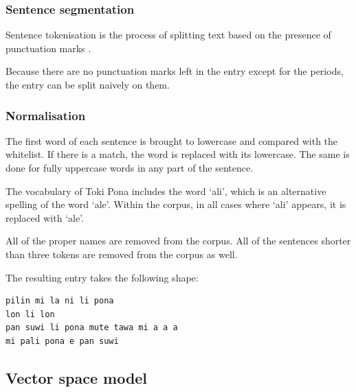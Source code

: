 \documentclass[14pt, a4paper]{extreport}
\begin{document}
%
      \subsubsection{Sentence segmentation}
Sentence tokenisation is the process of splitting text based on the presence of punctuation marks \parencite[51]{vajjala}.

Because there are no punctuation marks left in the entry except for the periods, the entry can be split naively on them.

      \subsubsection{Normalisation}
The first word of each sentence is brought to lowercase and compared with the whitelist. If there is a match, the word is replaced with its lowercase. The same is done for fully uppercase words in any part of the sentence.

The vocabulary of Toki Pona includes the word `ali', which is an alternative spelling of the word `ale'. Within the corpus, in all cases where `ali' appears, it is replaced with `ale'.

All of the proper names are removed from the corpus. All of the sentences shorter than three tokens are removed from the corpus as well.

The resulting entry takes the following shape:

\begin{lstlisting}
pilin mi la ni li pona
lon li lon
pan suwi li pona mute tawa mi a a a
mi pali pona e pan suwi
\end{lstlisting}

    \subsection{Vector space model}
\end{document}
